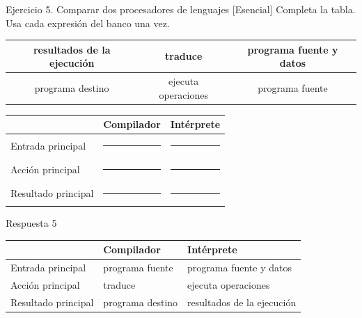 \documentclass[11pt,spanish]{article}
\newcommand{\blank}[1][4cm]{\rule{#1}{0.4pt}}
\begin{document}
\begin{ejercicio}{Ejercicio 5. Comparar dos procesadores de lenguajes \hfill {\small [Esencial]}}
Completa la tabla. Usa cada expresión del banco una vez.

\begin{center}
\small
\begin{tabular}{|c|c|c|}
\hline
resultados de la ejecución & traduce & programa fuente y datos \tabularnewline
\hline
programa destino & ejecuta operaciones & programa fuente \tabularnewline
\hline
\end{tabular}
\end{center}

\begin{center}
\renewcommand{\arraystretch}{1.45}
\begin{tabular}{|p{}|p{}|p{}|}
\hline
 & \textbf{Compilador} & \textbf{Intérprete} \tabularnewline
\hline
Entrada principal & \blank[3.7cm] & \blank[3.7cm] \tabularnewline
\hline
Acción principal & \blank[3.7cm] & \blank[3.7cm] \tabularnewline
\hline
Resultado principal & \blank[3.7cm] & \blank[3.7cm] \tabularnewline
\hline
\end{tabular}
\end{center}
\end{ejercicio}

\ifrespuestas
\begin{respuesta}{Respuesta 5}
\begin{center}
\renewcommand{\arraystretch}{1.25}
\begin{tabular}{|p{}|p{}|p{}|}
\hline
 & \textbf{Compilador} & \textbf{Intérprete} \tabularnewline
\hline
Entrada principal & programa fuente & programa fuente y datos \tabularnewline
\hline
Acción principal & traduce & ejecuta operaciones \tabularnewline
\hline
Resultado principal & programa destino & resultados de la ejecución \tabularnewline
\hline
\end{tabular}
\end{center}
\end{respuesta}
\fi
\end{document}
